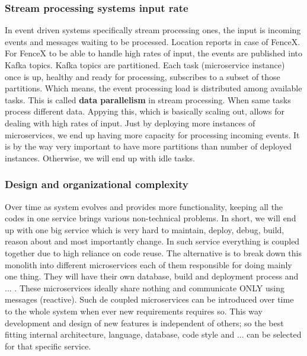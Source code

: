 \documentclass[a4]{report}
\begin{document}
        \subsubsection{Stream processing systems input rate}
        In event driven systems specifically stream processing ones, the input is incoming events and messages waiting to
        be processed.
        Location reports in case of FenceX.
        For FenceX to be able to handle high rates of input, the events are published into Kafka topics.
        Kafka topics are partitioned.
        Each task (microservice instance) once is up, healthy and ready for processing, subscribes to a subset of those
        partitions.
        Which means, the event processing load is distributed among available tasks.
        This is called \textbf{data parallelism} in stream processing.
        When same tasks process different data.
        Appying this, which is basically scaling out, allows for dealing with high rates of input.
        Just by deploying more instances of microservices, we end up having more capacity for processing incoming events.
        It is by the way very important to have more partitions than number of deployed instances.
        Otherwise, we will end up with idle tasks.

        \subsubsection{Design and organizational complexity}
        Over time as system evolves and provides more functionality, keeping all the codes in one service brings various
        non-technical problems.
        In short, we will end up with one big service which is very hard to maintain, deploy, debug, build, reason about
        and most importantly change.
        In such service everything is coupled together due to high reliance on code reuse.
        The alternative is to break down this monolith into different microservices each of them responsible for doing
        mainly one thing.
        They will have their own database, build and deployment process and ... .
        These microservices ideally share nothing and communicate ONLY using messages (reactive).
        Such de coupled microservices can be introduced over time to the whole system when ever new requirements requires so.
        This way development and design of new features is independent of others;
        so the best fitting internal architecture, language, database, code style and ... can be selected for that specific
        service.
\end{document}

